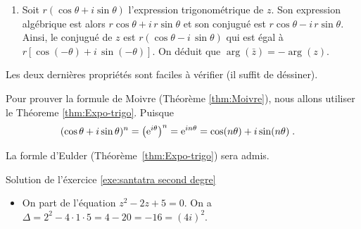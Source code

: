 \begin{corrige}
\begin{dem}
\begin{enumerate}
	      \begin{align*}
	            \arg\left( \frac{z}{z'} \right) & = \arg\left( z \cdot \frac{1}{z'} \right)      \\
	                                            & = \arg z + \arg\left( \frac{1}{z'} \right)
	                                              = \arg z - \arg z'                              .
	      \end{align*}
	\item Soit $r (\cos \theta + i \sin \theta)$ l'expression trigonom\'etrique de $z$. 
	      Son expression alg\'ebrique est alors $r \cos \theta + i \, r \sin \theta$ et 
	      son conjugu\'e est $r \cos \theta - i \, r \sin \theta$.
	      Ainsi, le conjugu\'e de $z$ est $ r ( \cos \theta - i \, \sin \theta) $ 
	      qui est \'egal \`a $ r \left[ \cos (- \theta ) + i \, \sin (- \theta) \right]$.
	      On d\'eduit que $\arg(\bar{z}) = - \arg(z)$.
\end{enumerate}
Les deux derni\`eres propri\'et\'es sont faciles \`a v\'erifier (il suffit de d\'essiner).
\end{dem}
\begin{dem}
	\label{dem:Moivre}
	Pour prouver la formule de Moivre (Th\'eor\`eme \ref{thm:Moivre}), nous allons utiliser le Th\'eoreme \ref{thm:Expo-trigo}.
	Puisque 
	\begin{align*}
	(\cos \theta + i \sin \theta)^n & = \left( \mathrm{e}^{i \theta} \right)^n         
	                                  = \mathrm{e}^{i n \theta}                        
	                                  = \cos (n \theta) + i \sin (n \theta)     \;.
	\end{align*}
\end{dem}
\begin{dem}
      \label{dem:Expo-trigo}
      La formle d'Eulder (Th\'eor\`eme~\ref{thm:Expo-trigo}) sera admis.
\end{dem}
\begin{sol}
\label{sol:santatra second degre}
Solution de l'\'exercice \ref{exe:santatra second degre} \\
	\begin{itemize}
		\item On part de l'\'equation $z^2 - 2 z + 5 = 0$. 
			On a $\Delta = 2^2 - 4 \cdot 1 \cdot 5 = 4 - 20 = -16 = (4i)^2$.

\end{itemize}
\end{sol}
\end{corrige}
